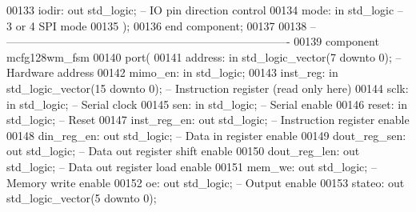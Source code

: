 \begin{DoxyCode}
00133         iodir: \textcolor{keywordflow}{out} \textcolor{comment}{std\_logic};                                               \textcolor{keyword}{-- IO pin direction control}
00134         mode: \textcolor{keywordflow}{in} \textcolor{comment}{std\_logic}\textcolor{keyword}{                                                  -- 3 or 4 SPI mode}
00135     );
00136 \textcolor{keywordflow}{end} \textcolor{keywordflow}{component};
00137 
00138 \textcolor{keyword}{-- ----------------------------------------------------------------------------}
00139 \textcolor{keywordflow}{component} mcfg128wm\_fsm
00140     \textcolor{keywordflow}{port}(
00141         address: \textcolor{keywordflow}{in} \textcolor{comment}{std\_logic\_vector}(\textcolor{vhdllogic}{}\textcolor{vhdllogic}{7} \textcolor{keywordflow}{downto} \textcolor{vhdllogic}{}\textcolor{vhdllogic}{0});   \textcolor{keyword}{-- Hardware address}
00142         mimo\_en: \textcolor{keywordflow}{in} \textcolor{comment}{std\_logic};
00143         inst\_reg: \textcolor{keywordflow}{in} \textcolor{comment}{std\_logic\_vector}(\textcolor{vhdllogic}{}\textcolor{vhdllogic}{15} \textcolor{keywordflow}{downto} \textcolor{vhdllogic}{}\textcolor{vhdllogic}{0}); \textcolor{keyword}{-- Instruction register (read only here)}
00144         sclk: \textcolor{keywordflow}{in} \textcolor{comment}{std\_logic};             \textcolor{keyword}{-- Serial clock}
00145         sen: \textcolor{keywordflow}{in} \textcolor{comment}{std\_logic};              \textcolor{keyword}{-- Serial enable}
00146         reset: \textcolor{keywordflow}{in} \textcolor{comment}{std\_logic};                \textcolor{keyword}{-- Reset}
00147         inst\_reg\_en: \textcolor{keywordflow}{out} \textcolor{comment}{std\_logic};         \textcolor{keyword}{-- Instruction register enable}
00148         din\_reg\_en: \textcolor{keywordflow}{out} \textcolor{comment}{std\_logic};          \textcolor{keyword}{-- Data in register enable}
00149         dout\_reg\_sen: \textcolor{keywordflow}{out} \textcolor{comment}{std\_logic};            \textcolor{keyword}{-- Data out register shift enable}
00150         dout\_reg\_len: \textcolor{keywordflow}{out} \textcolor{comment}{std\_logic};            \textcolor{keyword}{-- Data out register load enable}
00151         mem\_we: \textcolor{keywordflow}{out} \textcolor{comment}{std\_logic};              \textcolor{keyword}{-- Memory write enable}
00152         oe: \textcolor{keywordflow}{out} \textcolor{comment}{std\_logic};              \textcolor{keyword}{-- Output enable}
00153         stateo: \textcolor{keywordflow}{out} \textcolor{comment}{std\_logic\_vector}(\textcolor{vhdllogic}{}\textcolor{vhdllogic}{5} \textcolor{keywordflow}{downto} \textcolor{vhdllogic}{}\textcolor{vhdllogic}{0});

\end{DoxyCode}

